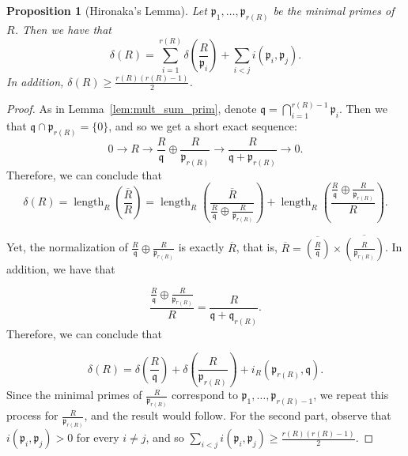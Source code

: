 \documentclass[10pt,a4paper]{amsart}
\newtheorem{proposition}{Proposition}
\DeclareMathOperator{\length}{length}
\begin{document}
\begin{proposition}[Hironaka's Lemma] \label{thm:branch}
    Let $\mathfrak{p}_1, \dots, \mathfrak{p}_{r(R)}$ be the minimal primes of $R$. Then we have that 
    \begin{equation*}
        \delta(R) = \sum_{i=1}^{r(R)}  \delta\left(\frac{R}{\mathfrak{p}_i}\right) + \sum_{i <  j} i(\mathfrak{p}_i, \mathfrak{p}_j).
    \end{equation*}
    In addition, $\delta(R) \geq \frac{r(R)(r(R)-1)}{2}$. 
\end{proposition}

\begin{proof}
As in Lemma~\ref{lem:mult_sum_prim}, denote $\mathfrak{q}=\bigcap_{i=1}^{r(R)-1} \mathfrak{p}_i$. Then we that $\mathfrak{q}\cap \mathfrak{p}_{r(R)} = \{0\}$, and so we get a short exact sequence:
\begin{equation*}
    0 \to R \to \frac{R}{\mathfrak{q}} \oplus \frac{R}{\mathfrak{p}_{r(R)}} \to \frac{R}{\mathfrak{q}+\mathfrak{p}_{r(R)}} \to 0. 
\end{equation*}
\noindent Therefore, we can conclude that 
\begin{equation*}
    \delta(R)=\length_R\left(\frac{\overline{R}}{R}\right) = \length_R\left(\frac{\overline{R}}{\frac{R}{\mathfrak{q}} \oplus \frac{R}{\mathfrak{p}_{r(R)}} }\right) + \length_R \left(\frac{\frac{R}{\mathfrak{q}} \oplus \frac{R}{\mathfrak{p}_{r(R)}} }{R} \right).
\end{equation*}

\noindent Yet, the normalization of $\frac{R}{\mathfrak{q}} \oplus \frac{R}{\mathfrak{p}_{r(R)}}$ is exactly $\overline{R}$, that is, $\overline{R} = \overline{\left(\frac{R}{\mathfrak{q}}\right)} \times \overline{\left(\frac{R}{\mathfrak{p}_{r(R)}}\right)}$. In addition, we have that


\begin{equation*}
    \frac{\frac{R}{\mathfrak{q}} \oplus \frac{R}{\mathfrak{p}_{r(R)}} }{R}  = \frac{R}{\mathfrak{q} + \mathfrak{q}_{r(R)}}. 
\end{equation*}
\noindent Therefore, we can conclude that 

\begin{equation*}
    \delta(R) = \delta\left(\frac{R}{\mathfrak{q}}\right) + \delta\left(\frac{R}{\mathfrak{p}_{r(R)}} \right) + i_R(\mathfrak{p}_{r(R)}, \mathfrak{q}).
\end{equation*}
\noindent Since the minimal primes of $\frac{R}{\mathfrak{p}_{r(R)}}$ correspond to $\mathfrak{p}_1, \dots, \mathfrak{p}_{r(R)-1}$, we repeat this process for $\frac{R}{\mathfrak{p}_{r(R)}}$, and the result would follow. For the second part, observe that $i(\mathfrak{p}_i, \mathfrak{p}_j)>0$ for every $i  \neq j$, and so $\sum_{i <  j} i(\mathfrak{p}_i, \mathfrak{p}_j) \geq \frac{r(R)(r(R)-1)}{2}$. 
\end{proof}
\end{document}
